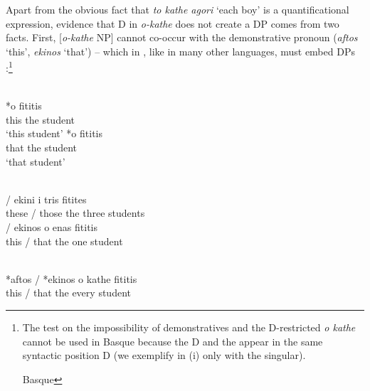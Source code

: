 \documentclass[output=paper,
modfonts
]{langscibook}
\begin{document}
Apart from the obvious fact that \textit{to kathe agori} `each boy' is a quantificational expression, evidence that D in \textit{o-kathe} does not create a DP comes from two facts. First, [\textit{o-kathe} NP] cannot co-occur with the demonstrative pronoun (\textit{aftos} `this', \textit{ekinos} `that') -- which in , like in many other languages, must embed DPs \citep{stavrou1983, stavrou-horrocks1989, AlexiadouEtAlii2008}:\footnote{The  test on the impossibility of demonstratives and the D-restricted \textit{o kathe}  cannot be used in Basque because the D and the  appear in the same syntactic position D (we exemplify in (i) only with the singular). \newpage 

\ea \label{ex:etxeberria:i} \textnormal{Basque}
	\z
\z} \newpage 

\ea\label{ex:etxeberria:25} \\
\ea
{} \textnormal{*}{\op}{o}{\cp} {fititis}\\
this \phantom{*(}the student\\
\glt `this student'
\ex
{} \textnormal{*}{\op}{o}{\cp} {fititis}\\
that \phantom{*(}the student\\
\glt `that student'
\z
\z

\ea\label{ex:etxeberria:26} \\
\ea
{} \textnormal{/} {ekini} {i} {tris} {fitites}\\
these / those the three students\\
\ex
{} \textnormal{/} {ekinos} {o} {enas} {fititis}\\
this / that the one student\\
\z
\z

\ea\label{ex:etxeberria:27} \\
\gll \textnormal{*}{aftos} \textnormal{/} \textnormal{*}{ekinos} {o} {kathe} {fititis}\\
\phantom{*}this / \phantom{*}that the every student\\
\z
\end{document}
